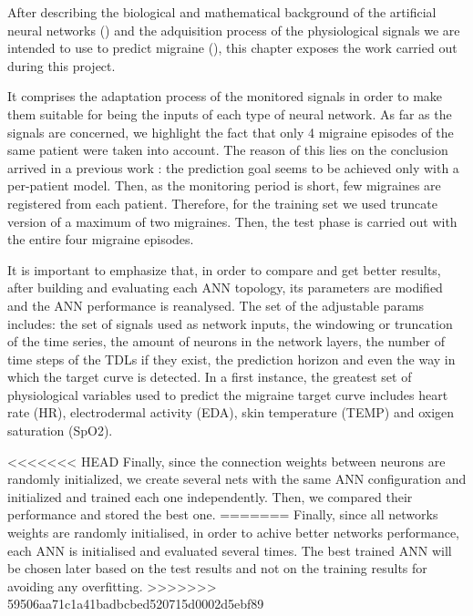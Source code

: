\label{chapter:application}

After describing the biological and mathematical background of the
artificial neural networks () and the adquisition process
of the physiological signals we are intended to use to predict
migraine (), this chapter exposes the work carried out
during this project.


It comprises the adaptation process of the monitored signals in order
to make them suitable for being the inputs of each type of neural
network.  As far as the signals are concerned, we highlight the fact
that only 4 migraine episodes of the same patient were taken into
account.  The reason of this lies on the conclusion arrived in a
previous work \cite{Irene:PFC:2014}: the prediction goal seems to be
achieved only with a per-patient model.  Then, as the monitoring period
is short, few migraines are registered from each patient.  Therefore,
for the training set we used truncate version of a maximum of two
migraines. Then, the test phase is carried out with the entire four
migraine episodes.


It is important to emphasize that, in order to compare and get better
results, after building and evaluating each ANN topology, its
parameters are modified and the ANN performance is reanalysed.  The
set of the adjustable params includes: the set of signals used as
network inputs, the windowing or truncation of the time series, the
amount of neurons in the network layers, the number of time steps of
the TDLs if they exist, the prediction horizon and even the way in
which the target curve is detected.  In a first instance, the greatest
set of physiological variables used to predict the migraine target
curve includes heart rate (HR), electrodermal activity (EDA), skin
temperature (TEMP) and oxigen saturation (SpO2).

<<<<<<< HEAD
Finally, since the connection weights between neurons are randomly initialized,
we create several nets with the same ANN configuration and initialized
and trained each one independently. 
Then, we compared their performance and stored the best one.
=======
Finally, since all networks weights are randomly initialised, in order
to achive better networks performance, each ANN is initialised and
evaluated several times. The best trained ANN will be chosen later
based on the test results and not on the training results for avoiding
any overfitting.
>>>>>>> 59506aa71c1a41badbcbed520715d0002d5ebf89
